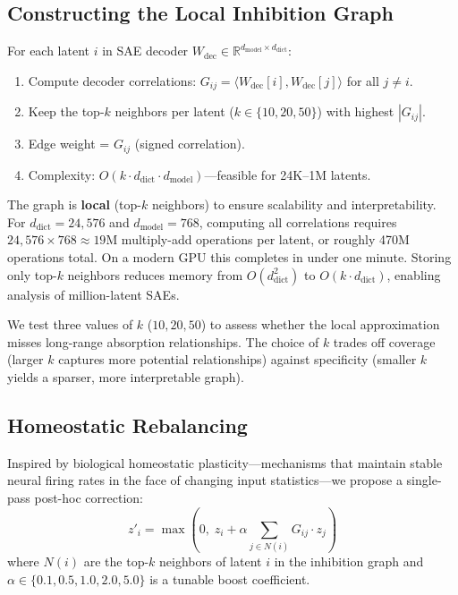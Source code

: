 \documentclass{article}
\begin{document}
\subsection{Constructing the Local Inhibition Graph}
\label{sec:graph-construction}

For each latent $i$ in SAE decoder $W_{\text{dec}} \in \mathbb{R}^{d_{\text{model}} \times d_{\text{dict}}}$:
\begin{enumerate}
\item Compute decoder correlations: $G_{ij} = \langle W_{\text{dec}}[i], W_{\text{dec}}[j] \rangle$ for all $j \neq i$.
\item Keep the top-$k$ neighbors per latent ($k \in \{10, 20, 50\}$) with highest $|G_{ij}|$.
\item Edge weight = $G_{ij}$ (signed correlation).
\item Complexity: $O(k \cdot d_{\text{dict}} \cdot d_{\text{model}})$---feasible for 24K--1M latents.
\end{enumerate}

The graph is \textbf{local} (top-$k$ neighbors) to ensure scalability and interpretability. For $d_{\text{dict}} = 24{,}576$ and $d_{\text{model}} = 768$, computing all correlations requires $24{,}576 \times 768 \approx 19$M multiply-add operations per latent, or roughly 470M operations total. On a modern GPU this completes in under one minute. Storing only top-$k$ neighbors reduces memory from $O(d_{\text{dict}}^2)$ to $O(k \cdot d_{\text{dict}})$, enabling analysis of million-latent SAEs.

We test three values of $k$ ($10, 20, 50$) to assess whether the local approximation misses long-range absorption relationships. The choice of $k$ trades off coverage (larger $k$ captures more potential relationships) against specificity (smaller $k$ yields a sparser, more interpretable graph).

\subsection{Homeostatic Rebalancing}
\label{sec:homeostatic}

Inspired by biological homeostatic plasticity---mechanisms that maintain stable neural firing rates in the face of changing input statistics---we propose a single-pass post-hoc correction:
\begin{equation}
z'_i = \max\left(0, \; z_i + \alpha \sum_{j \in N(i)} G_{ij} \cdot z_j\right)
\end{equation}
where $N(i)$ are the top-$k$ neighbors of latent $i$ in the inhibition graph and $\alpha \in \{0.1, 0.5, 1.0, 2.0, 5.0\}$ is a tunable boost coefficient.
\end{document}
